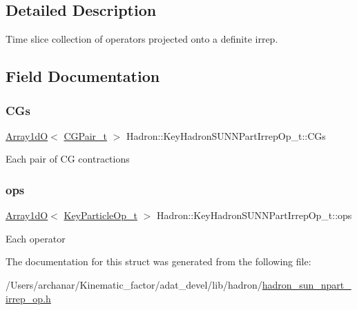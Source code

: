 \subsection{Detailed Description}
Time slice collection of operators projected onto a definite irrep. 

\subsection{Field Documentation}
\mbox{\label{structHadron_1_1KeyHadronSUNNPartIrrepOp__t_aa3ef7f36892b1bd638732a7ac69aa21d}} 
\subsubsection{\texorpdfstring{CGs}{CGs}}
{\footnotesize\ttfamily \mbox{\hyperlink{classADAT_1_1Array1dO}{Array1dO}}$<$ \mbox{\hyperlink{structHadron_1_1KeyHadronSUNNPartIrrepOp__t_1_1CGPair__t}{C\+G\+Pair\+\_\+t}} $>$ Hadron\+::\+Key\+Hadron\+S\+U\+N\+N\+Part\+Irrep\+Op\+\_\+t\+::\+C\+Gs}

Each pair of CG contractions \mbox{\label{structHadron_1_1KeyHadronSUNNPartIrrepOp__t_acc3063e2e1de5f3c10160e9f16e01308}} 
\subsubsection{\texorpdfstring{ops}{ops}}
{\footnotesize\ttfamily \mbox{\hyperlink{classADAT_1_1Array1dO}{Array1dO}}$<$ \mbox{\hyperlink{structHadron_1_1KeyParticleOp__t}{Key\+Particle\+Op\+\_\+t}} $>$ Hadron\+::\+Key\+Hadron\+S\+U\+N\+N\+Part\+Irrep\+Op\+\_\+t\+::ops}

Each operator 

The documentation for this struct was generated from the following file\+:\begin{DoxyCompactItemize}
\item 
/\+Users/archanar/\+Kinematic\+\_\+factor/adat\+\_\+devel/lib/hadron/\mbox{\hyperlink{lib_2hadron_2hadron__sun__npart__irrep__op_8h}{hadron\+\_\+sun\+\_\+npart\+\_\+irrep\+\_\+op.\+h}}\end{DoxyCompactItemize}
